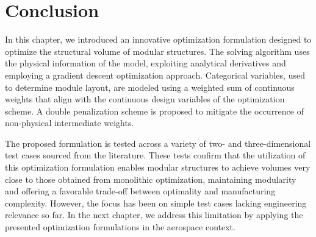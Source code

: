 \section{Conclusion}
In this chapter, we introduced an innovative optimization formulation designed to optimize the structural volume of modular structures. The solving algorithm uses the physical information of the model, exploiting analytical derivatives and employing a gradient descent optimization approach. Categorical variables, used to determine module layout, are modeled using a weighted sum of continuous weights that align with the continuous design variables of the optimization scheme. A double penalization scheme is proposed to mitigate the occurrence of non-physical intermediate weights.

The proposed formulation is tested across a variety of two- and three-dimensional test cases sourced from the literature. These tests confirm that the utilization of this optimization formulation enables modular structures to achieve volumes very close to those obtained from monolithic optimization, maintaining modularity and offering a favorable trade-off between optimality and manufacturing complexity. However, the focus has been on simple test cases lacking engineering relevance so far. In the next chapter, we address this limitation by applying the presented optimization formulations in the aerospace context.